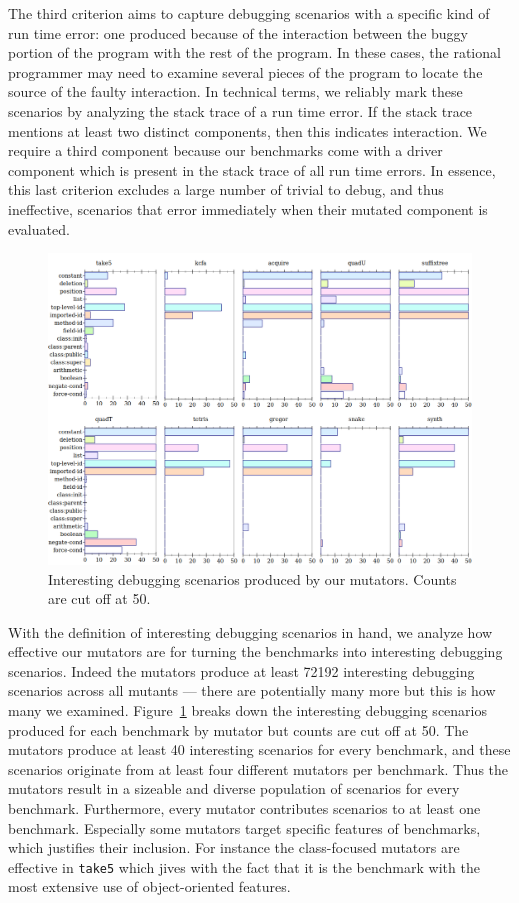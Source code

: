 The third criterion aims to capture debugging scenarios with a specific
kind of run time error: one produced because of the interaction between the buggy
portion of the program with the rest of the program.  In these cases, the rational programmer
may need to examine several pieces of the program to locate the source of the faulty interaction.
In technical terms, we reliably mark these scenarios by
analyzing the stack trace of a run time error.  If the stack trace mentions at
least two distinct components, then this indicates interaction.  We require a third component because our benchmarks come
with a driver component which is present in the stack trace of all run
time errors. In essence, this last criterion excludes a large number of
trivial to debug, and thus ineffective, scenarios that error immediately when their mutated component is
evaluated. 


\begin{figure}
  \centering
  \includegraphics[scale=0.35]{./plots/mutant-breakdown}
  \caption{Interesting debugging scenarios produced by our mutators. Counts are cut off at 50.}
  \label{fig:mutant-breakdown}
\end{figure}


With the definition of interesting debugging scenarios in hand, we analyze how effective our mutators
are for turning the benchmarks into interesting debugging scenarios.
Indeed the mutators produce at least 72192 interesting debugging scenarios
across all mutants --- there are potentially many more but this is how
many we examined. 
Figure~\ref{fig:mutant-breakdown} breaks down the interesting
debugging scenarios produced  for each benchmark by mutator 
but counts are cut off at 50. The mutators produce at least 40 interesting
scenarios for every benchmark, and these scenarios originate from at
least four different mutators per benchmark.  Thus the mutators result in 
a sizeable and diverse population of scenarios for every benchmark.
Furthermore, every mutator contributes scenarios to at least one
benchmark. Especially some mutators  target specific features of
benchmarks, which
justifies their inclusion. For
instance the class-focused mutators are effective in \texttt{take5}
which jives with the fact that it is the benchmark with 
the most extensive use of object-oriented features.
